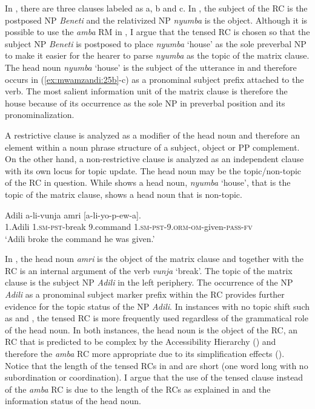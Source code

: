 \documentclass[output=paper,colorlinks,citecolor=brown]{langscibook}
\begin{document}
In , there are three clauses labeled as a, b and c. In , the subject of the RC is the postposed NP \textit{Beneti} and the relativized NP \textit{nyumba} is the object. Although it is possible to use the \textit{amba} RM in , I argue that the tensed RC is chosen so that the subject NP \textit{Beneti} is postposed to place \textit{nyumba} ‘house’ as the sole preverbal NP to make it easier for the hearer to parse \textit{nyumba} as the topic of the matrix clause. The head noun \textit{nyumba} ‘house’ is the subject of the utterance in  and therefore occurs in (\ref{ex:mwamzandi:25b}-c) as a pronominal subject prefix attached to the verb. The most salient information unit of the matrix clause is therefore the house because of its occurrence as the sole NP in preverbal position and its pronominalization.

A restrictive clause is analyzed as a modifier of the head noun and therefore an element within a noun phrase structure of a subject, object or PP complement. On the other hand, a non-restrictive clause is analyzed as an independent clause with its own locus for topic update. The head noun may be the topic/non-topic of the RC in question. While  shows a head noun, \textit{nyumba} ‘house’, that is the topic of the matrix clause,  shows a head noun that is non-topic.

\ea%
    \label{ex:mwamzandi:26}
    \gll    Adili a-li-vunja amri [a-li-yo-p-ew-a].\\
            1.Adili \textsc{1.sm-pst-}break 9.command \textsc{1.sm-pst-9.orm-om-}given\textsc{-pass-fv}\\
    \glt    ‘Adili broke the command he was given.’
\z


In , the head noun \textit{amri} is the object of the matrix clause and together with the RC is an internal argument of the verb \textit{vunja} ‘break’. The topic of the matrix clause is the subject NP \textit{Adili} in the left periphery. The occurrence of the NP \textit{Adili} as a pronominal subject marker prefix within the RC provides further evidence for the topic status of the NP \textit{Adili}. In instances with no topic shift such as  and , the tensed RC is more frequently used regardless of the grammatical role of the head noun. In both instances, the head noun is the object of the RC, an RC that is predicted to be complex by the Accessibility Hierarchy (\citealt{KeenanComrie1977}) and therefore the \textit{amba} RC more appropriate due to its simplification effects (\citealt{Ashton1944, Schadeberg1989}). Notice that the length of the tensed RCs in  and  are short (one word long with no subordination or coordination). I argue that the use of the tensed clause instead of the \textit{amba} RC is due to the length of the RCs as explained in  and the information status of the head noun.
\end{document}
